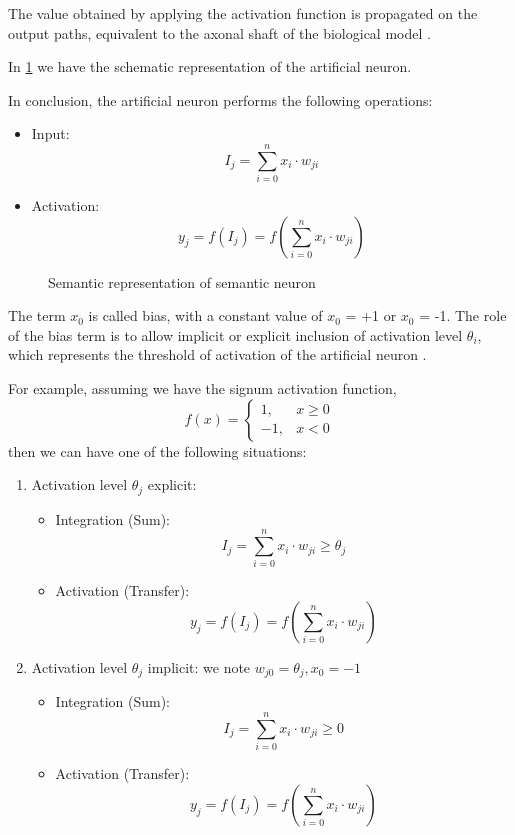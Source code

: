 The value obtained by applying the activation function is propagated on the output paths, equivalent to the axonal shaft of the biological model \cite{calculNeuronal}.

In \figurename{ \ref{fig:artificialNeuron}} we have the schematic representation of the artificial neuron.

In conclusion, the artificial neuron performs the following operations:

\begin{itemize}
    \item Input: $$ I_j = \sum_{i=0}^{n} x_i \cdot w_{ji} $$
    \item Activation: $$ y_j = f(I_j) = f(\sum_{i=0}^{n} x_i \cdot w_{ji}) $$
\end{itemize}


\begin{figure}[H]
    \centering
    \resizebox{10cm}{!}{}
    \caption{Semantic representation of semantic neuron}
    \label{fig:artificialNeuron}
\end{figure}

\begin{obs}
\label{obs:bias}
    The term $ x_0 $ is called bias, with a constant value of $ x_0 $ = +1 or $ x_0 $ = -1. The role of the bias term is to allow implicit or explicit inclusion of activation level $ \theta_i $, which represents the threshold of activation of the artificial neuron \cite{calculNeuronal}.
\end{obs}

For example, assuming we have the signum activation function,
$$f(x)=
  \begin{cases} 
    1, & x \geq 0 \\ 
    -1, & x < 0 
  \end{cases}$$
then we can have one of the following situations:\\
\begin{enumerate}
    \item Activation level $\theta_j$ explicit:
        \begin{itemize}
            \item Integration (Sum): $$ I_j = \sum_{i=0}^{n} x_i \cdot w_{ji} \geq \theta_j $$
            \item Activation (Transfer): $$ y_j = f(I_j) = f(\sum_{i=0}^{n} x_i \cdot w_{ji}) $$
        \end{itemize}
    \item Activation level $\theta_j$ implicit: we note $w_{j0} = \theta_j, x_0 = -1$
        \begin{itemize}
            \item Integration (Sum): $$ I_j = \sum_{i=0}^{n} x_i \cdot w_{ji} \geq 0 $$
            \item Activation (Transfer): $$ y_j = f(I_j) = f(\sum_{i=0}^{n} x_i \cdot w_{ji}) $$
        \end{itemize}
\end{enumerate}


